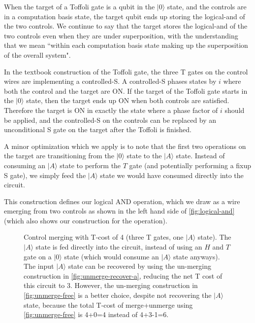 \documentclass[twocolumn,longbibliography]{quantumarticle-customized}
\newcommand{\qH}{\gate{H}}
\newcommand{\qT}{\gate{T}}
\newcommand{\qTi}{\gate{T^\dagger}}
\newcommand{\qS}{\gate{S}}
\begin{document}
When the target of a Toffoli gate is a qubit in the $|0\rangle$ state, and the controls are in a computation basis state, the target qubit ends up storing the logical-and of the two controls.
We continue to say that the target stores the logical-and of the two controls even when they are under superposition, with the understanding that we mean ``within each computation basis state making up the superposition of the overall system".

In the textbook construction of the Toffoli gate, the three T gates on the control wires are implementing a controlled-S.
A controlled-S phases states by $i$ where both the control and the target are ON.
If the target of the Toffoli gate starts in the $|0\rangle$ state, then the target ends up ON when both controls are satisfied.
Therefore the target is ON in exactly the state where a phase factor of $i$ should be applied, and the controlled-S on the controls can be replaced by an unconditional S gate on the target after the Toffoli is finished.

A minor optimization which we apply is to note that the first two operations on the target are transitioning from the $|0\rangle$ state to the $|A\rangle$ state.
Instead of consuming an $|A\rangle$ state to perform the $T$ gate (and potentially performing a fixup S gate), we simply feed the $|A\rangle$ state we would have consumed directly into the circuit.

This construction defines our logical AND operation, which we draw as a wire emerging from two controls as shown in the left hand side of \autoref{fig:logical-and} (which also shows our construction for the operation).

\begin{figure}
  \resizebox{\linewidth}{!}{
    \Qcircuit @R=1.5em @C=0.7em {
      &x &&\ctrl{1} &\qw & x  && &&          &&\qw      &\qw  &\ctrl{2} &\qw &\qw      &\qw  &\ctrl{2} &\qw &\qw &\qw &\\
      &y &&\ctrl{1} &\qw & y  &&=&&          &&\ctrl{1} &\qw  &\qw      &\qw &\ctrl{1} &\qw  &\qw      &\qw &\qw &\qw &\\
      &  &&         &\qw & xy && &&|A\rangle &&\targ    &\qTi &\targ    &\qT &\targ    &\qTi &\targ    &\qH &\qS &\qw &\\
    }
  }
  \caption{
	Control merging with T-cost of 4 (three T gates, one $|A\rangle$ state).
	The $|A\rangle$ state is fed directly into the circuit, instead of using an $H$ and $T$ gate on a $|0\rangle$ state (which would consume an $|A\rangle$ state anyways).
	The input $|A\rangle$ state can be recovered by using the un-merging construction in \autoref{fig:unmerge-recover-a}, reducing the net T cost of this circuit to 3.
	However, the un-merging construction in \autoref{fig:unmerge-free} is a better choice, despite not recovering the $|A\rangle$ state, because the total T-cost of merge+unmerge using \autoref{fig:unmerge-free} is 4+0=4 instead of 4+3-1=6.
  }
  \label{fig:logical-and}
\end{figure}
\end{document}
